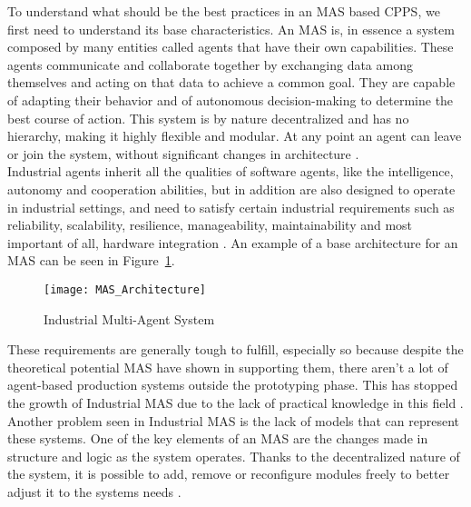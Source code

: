 To understand what should be the best practices in an \gls{MAS} based \gls{CPPS}, we first need to understand its base characteristics. An \Gls{MAS} is, in essence a system composed by many entities called agents that have their own capabilities. These agents communicate and collaborate together by exchanging data among themselves and acting on that data to achieve a common goal. They are capable of adapting their behavior and of autonomous decision-making to determine the best course of action. This system is by nature decentralized and has no hierarchy, making it highly flexible and modular. At any point an agent can leave or join the system, without significant changes in architecture \cite{paulo02}.\\

Industrial agents inherit all the qualities of software agents, like the intelligence, autonomy and cooperation abilities, but in addition are also designed to operate in industrial settings, and need to satisfy certain industrial requirements such as reliability, scalability, resilience, manageability, maintainability and most important of all, hardware integration \cite{Leitao2021}. An example of a base architecture for an \gls{MAS} can be seen in Figure~\ref{fig:MAS_Architecture}. \\

\begin{figure}[h!]
	\centering
	\texttt{[image: MAS\_Architecture]}
	\caption{Industrial Multi-Agent System}
	\label{fig:MAS_Architecture}
\end{figure}

These requirements are generally tough to fulfill, especially so because despite the theoretical potential \gls{MAS} have shown in supporting them, there aren't a lot of agent-based production systems outside the prototyping phase. This has stopped the growth of Industrial \gls{MAS} due to the lack of practical knowledge in this field \cite{Karnouskos2019}. Another problem seen in Industrial \gls{MAS} is the lack of models that can represent these systems. One of the key elements of an \gls{MAS} are the changes made in structure and logic as the system operates. Thanks to the decentralized nature of the system, it is possible to add, remove or reconfigure modules freely to better adjust it to the systems needs \cite{Karnouskos2019}.\\

